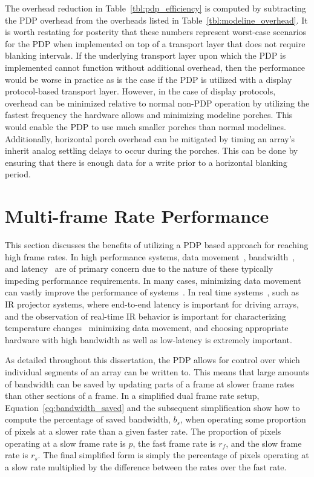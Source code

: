     The overhead reduction in Table~\ref{tbl:pdp_efficiency} is computed by subtracting the PDP overhead from the overheads listed in Table~\ref{tbl:modeline_overhead}. It is worth restating for posterity that these numbers represent worst-case scenarios for the PDP when implemented on top of a transport layer that does not require blanking intervals. If the underlying transport layer upon which the PDP is implemented cannot function without additional overhead, then the performance would be worse in practice as is the case if the PDP is utilized with a display protocol-based transport layer. However, in the case of display protocols, overhead can be minimized relative to normal non-PDP operation by utilizing the fastest frequency the hardware allows and minimizing modeline porches. This would enable the PDP to use much smaller porches than normal modelines. Additionally, horizontal porch overhead can be mitigated by timing an array's inherit analog settling delays to occur during the porches. This can be done by ensuring that there is enough data for a write prior to a horizontal blanking period.

\section{Multi-frame Rate Performance}
    \label{sec:multi_framerate_performance}

    This section discusses the benefits of utilizing a PDP based approach for reaching high frame rates. In high performance systems, data movement~\cite{LeeEtAl1984}, bandwidth~\cite{LaiBaker1999}, and latency~\cite{ZhengEtAl2014} are of primary concern due to the nature of these typically impeding performance requirements. In many cases, minimizing data movement can vastly improve the performance of systems~\cite{BandyopadhyayCoyle2004,LiEtAl2009,Hall2020}. In real time systems~\cite{Kopetz2011}, such as IR projector systems, where end-to-end latency is important for driving arrays, and the observation of real-time IR behavior is important for characterizing temperature changes~\cite{ZhouEtAl2000} minimizing data movement, and choosing appropriate hardware with high bandwidth as well as low-latency is extremely important.

    As detailed throughout this dissertation, the PDP allows for control over which individual segments of an array can be written to. This means that large amounts of bandwidth can be saved by updating parts of a frame at slower frame rates than other sections of a frame. In a simplified dual frame rate setup, Equation~\eqref{eq:bandwidth_saved} and the subsequent simplification show how to compute the percentage of saved bandwidth, $b_s$, when operating some proportion of pixels at a slower rate than a given faster rate. The proportion of pixels operating at a slow frame rate is $p$, the fast frame rate is $r_f$, and the slow frame rate is $r_s$. The final simplified form is simply the percentage of pixels operating at a slow rate multiplied by the difference between the rates over the fast rate.

